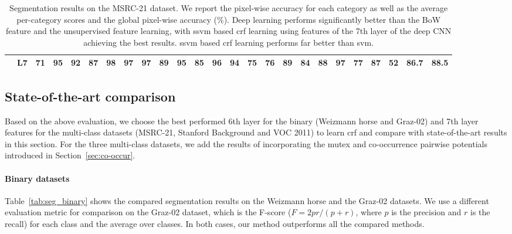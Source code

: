 \documentclass[10pt,3p]{elsarticle}
\newcommand{\ssvm}{{\sc ssvm}\xspace}
\newcommand{\svm}{{\sc svm}\xspace}
\newcommand{\crf}{{\sc crf}\xspace}
\begin{document}
\begin{table}[!t]
{\begin{tabular}{ c c| c c c c c c c c c c c c c c c c c c c c c |c c }
&L7   &71    &95    &92    &87    &98    &97    &97    &89    &95    &85    &96    &94    &75    &76    &89    &84    &88    &97    &77    &87    &52   &\textbf{86.7} &\textbf{88.5} \\
\hline
%
%
\end{tabular}
}
\caption{Segmentation results on the MSRC-21 dataset.
%
%
We report the pixel-wise accuracy for each category as well as the average per-category scores and the global pixel-wise accuracy (\%). 
Deep learning performs significantly better than the BoW feature and the unsupervised feature learning, with \ssvm based \crf learning using features of the 7th layer of the deep CNN achieving the best results. 
\ssvm based \crf learning performs far better than \svm.
}
\label{tab:seg_msrc_baseline}
\end{table}\subsection{State-of-the-art comparison}\label{sec:exp2}
Based on the above evaluation, we choose the best performed 6th layer for the binary (Weizmann horse and Graz-02) and 7th layer features for the multi-class datasets (MSRC-21, Stanford Background and VOC 2011)  to learn \crf and compare with state-of-the-art results in this section. 
For the three multi-class datasets, we add the results of incorporating the mutex and co-occurrence pairwise potentials introduced in Section~\ref{sec:co-occur}.

\paragraph{Binary datasets}
Table~\ref{tab:seg_binary} shows the compared segmentation results on the Weizmann horse and the Graz-02 datasets. We use a different evaluation metric for comparison on the Graz-02 dataset, which is the F-score ($F=2pr/(p+r)$, where $p$ is the precision and $r$ is the recall) for each class and the average over classes. In both cases, our method outperforms all the compared methods. 
\end{document}
